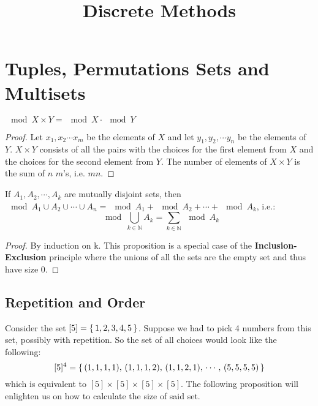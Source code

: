 \documentclass[a4paper]{article}
\title{Discrete Methods}
\begin{document}
	\maketitle
	\tableofcontents
	\section{Tuples, Permutations Sets and Multisets}
	
	
	\begin{proposition}\label{prop:1.1}
		$\mod{X \times Y} = \mod X \cdot \mod Y $
	\end{proposition}
	
	\begin{proof}
		Let $x_1, x_2 \cdots x_m$ be the elements of $X$ and let $y_1, y_2, \cdots y_n$ be the elements of $Y$. $X \times Y$ consists of all the pairs with the choices for the first element from $X$ and the choices for the second element from $Y$. The number of elements of $X \times Y$ is the sum of $n$ $m$'s, i.e. $mn$.
	\end{proof}
	
	
	\begin{proposition}\label{prop:1.2}
		If $A_1, A_2, \cdots, A_k$ are mutually disjoint sets, then $\mod{A_1 \cup A_2 \cup \cdots \cup A_n} = \mod{A_1} + \mod{A_2} + \cdots + \mod{A_k}$, i.e.: \[\mod{\bigcup_{k\in\mathbb N}A_k} = \sum_{k\in\mathbb N} \mod{A_k}\]
	\end{proposition}
	
	\begin{proof}
		By induction on k. This proposition is a special case of the \textbf{Inclusion-Exclusion} principle where the unions of all the sets are the empty set and thus have size 0.
	\end{proof}
	
	\newpage
	
	\subsection{Repetition and Order}
	
	Consider the set $[5] = \set{1,2,3,4,5}$. Suppose we had to pick 4 numbers from this set, possibly with repetition. So the set of all choices would look like the following: \[[5]^4= \set{(1,1,1,1),\, (1,1,1,2),\, (1,1,2,1),\, \cdots,\, (5,5,5,5)}\] which is equivalent to $[5] \times [5] \times [5] \times [5]$. The following proposition will enlighten us on how to calculate the size of said set.
	
\end{document}
